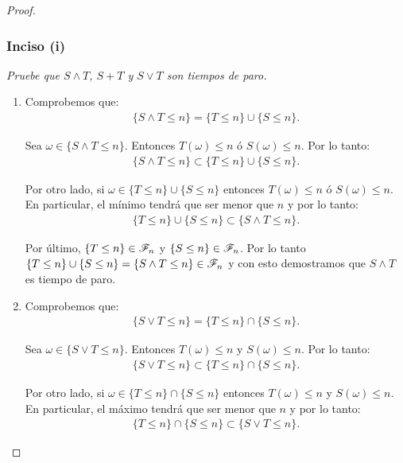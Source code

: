 \begin{proof}
	\subsubsection{Inciso (i)} 
	\emph{
		Pruebe que ${ S \wedge T }$, ${ S + T }$ y ${ S \vee T}$ son tiempos de paro.\\
	}
	
		\begin{enumerate}
			\item 
				Comprobemos que:
				\begin{align}
					\{ S \wedge T \leq n \} = \{ T \leq n \} \cup \{ S \leq n\}.
				\end{align}
				
				Sea ${\omega \in \{ S \wedge T \leq n \}}$. Entonces ${T(\omega) \leq n}$ ó ${S(\omega) \leq n}$.
				Por lo tanto:
				\begin{align}
						\{ S \wedge T \leq n \} \subset \{ T \leq n \} \cup \{ S \leq n\}.							
				\end{align}
				
				Por otro lado, si ${\omega \in \{ T \leq n \} \cup \{ S \leq n\}}$ entonces ${T(\omega) \leq n}$ ó ${S(\omega) \leq n}$.
				En particular, el mínimo tendrá que ser menor que ${n}$ y por lo tanto:
				\begin{align}
						\{ T \leq n \} \cup \{ S \leq n\} \subset \{ S \wedge T \leq n \}.						
				\end{align}
				
				Por último, ${\{ T \leq n \} \in \mathscr{F}_n}$ y ${\{ S \leq n \} \in \mathscr{F}_n}$. Por lo tanto	\\	
				${\{ T \leq n \} \cup \{ S \leq n\} = \{ S \wedge T \leq n \} \in \mathscr{F}_n}$ y con esto demostramos que 
				${ S \wedge T}$ es tiempo de paro.\\
				
			\item
				Comprobemos que:
				\begin{align}
					\{ S \vee T \leq n \} = \{ T \leq n \} \cap \{ S \leq n\}.
				\end{align}
				
				Sea ${\omega \in \{ S \vee T \leq n \}}$. Entonces ${T(\omega) \leq n}$ y ${S(\omega) \leq n}$.
				Por lo tanto:
				\begin{align}
						\{ S \vee T \leq n \} \subset \{ T \leq n \} \cap \{ S \leq n\}.							
				\end{align}
				
				Por otro lado, si ${\omega \in \{ T \leq n \} \cap \{ S \leq n\}}$ entonces ${T(\omega) \leq n}$ y ${S(\omega) \leq n}$.
				En particular, el máximo tendrá que ser menor que ${n}$ y por lo tanto:
				\begin{align}
						\{ T \leq n \} \cap \{ S \leq n\} \subset \{ S \vee T \leq n \}.						
				\end{align}
				

\end{enumerate}
\end{proof}
